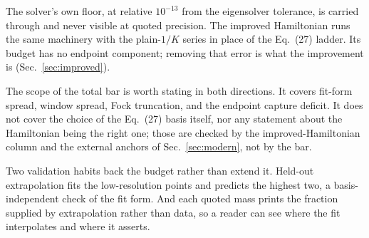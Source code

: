 The solver's own floor, at relative $10^{-13}$ from the eigensolver
tolerance, is carried through and never visible at quoted precision.  The
improved Hamiltonian runs the same machinery with the plain-$1/K$ series in
place of the Eq.~(27) ladder.  Its budget has no endpoint component;
removing that error is what the improvement is (Sec.~\ref{sec:improved}).

The scope of the total bar is worth stating in both directions.  It covers
fit-form spread, window spread, Fock truncation, and the endpoint capture
deficit.  It does not cover the choice of the Eq.~(27) basis itself, nor
any statement about the Hamiltonian being the right one; those are checked
by the improved-Hamiltonian column and the external anchors of
Sec.~\ref{sec:modern}, not by the bar.

Two validation habits back the budget rather than extend it.  Held-out
extrapolation fits the low-resolution points and predicts the highest two,
a basis-independent check of the fit form.  And each quoted mass prints the
fraction supplied by extrapolation rather than data, so a reader can see
where the fit interpolates and where it asserts.
